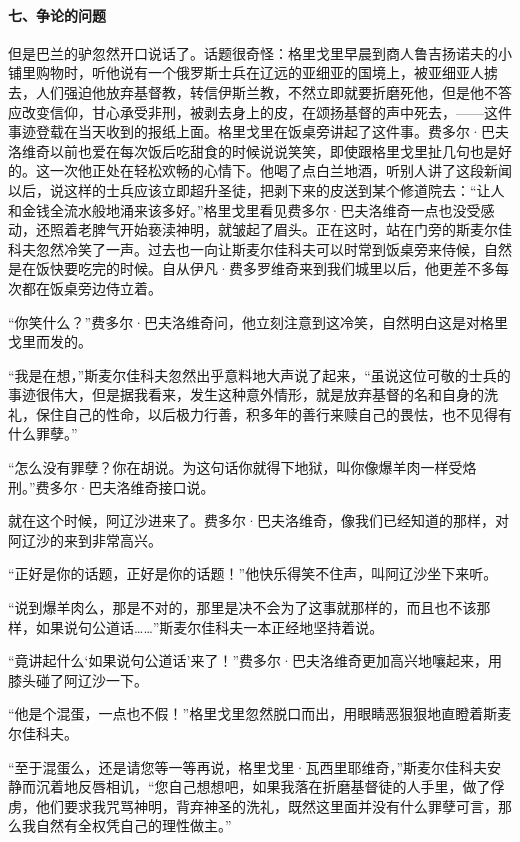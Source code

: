 \paragraph*{七、争论的问题}
\par 但是巴兰的驴忽然开口说话了。话题很奇怪：格里戈里早晨到商人鲁吉扬诺夫的小铺里购物时，听他说有一个俄罗斯士兵在辽远的亚细亚的国境上，被亚细亚人掳去，人们强迫他放弃基督教，转信伊斯兰教，不然立即就要折磨死他，但是他不答应改变信仰，甘心承受非刑，被剥去身上的皮，在颂扬基督的声中死去，——这件事迹登载在当天收到的报纸上面。格里戈里在饭桌旁讲起了这件事。费多尔·巴夫洛维奇以前也爱在每次饭后吃甜食的时候说说笑笑，即使跟格里戈里扯几句也是好的。这一次他正处在轻松欢畅的心情下。他喝了点白兰地酒，听别人讲了这段新闻以后，说这样的士兵应该立即超升圣徒，把剥下来的皮送到某个修道院去：“让人和金钱全流水般地涌来该多好。”格里戈里看见费多尔·巴夫洛维奇一点也没受感动，还照着老脾气开始亵渎神明，就皱起了眉头。正在这时，站在门旁的斯麦尔佳科夫忽然冷笑了一声。过去也一向让斯麦尔佳科夫可以时常到饭桌旁来侍候，自然是在饭快要吃完的时候。自从伊凡·费多罗维奇来到我们城里以后，他更差不多每次都在饭桌旁边侍立着。
\par “你笑什么？”费多尔·巴夫洛维奇问，他立刻注意到这冷笑，自然明白这是对格里戈里而发的。
\par “我是在想，”斯麦尔佳科夫忽然出乎意料地大声说了起来，“虽说这位可敬的士兵的事迹很伟大，但是据我看来，发生这种意外情形，就是放弃基督的名和自身的洗礼，保住自己的性命，以后极力行善，积多年的善行来赎自己的畏怯，也不见得有什么罪孽。”
\par “怎么没有罪孽？你在胡说。为这句话你就得下地狱，叫你像爆羊肉一样受烙刑。”费多尔·巴夫洛维奇接口说。
\par 就在这个时候，阿辽沙进来了。费多尔·巴夫洛维奇，像我们已经知道的那样，对阿辽沙的来到非常高兴。
\par “正好是你的话题，正好是你的话题！”他快乐得笑不住声，叫阿辽沙坐下来听。
\par “说到爆羊肉么，那是不对的，那里是决不会为了这事就那样的，而且也不该那样，如果说句公道话……”斯麦尔佳科夫一本正经地坚持着说。
\par “竟讲起什么‘如果说句公道话’来了！”费多尔·巴夫洛维奇更加高兴地嚷起来，用膝头碰了阿辽沙一下。
\par “他是个混蛋，一点也不假！”格里戈里忽然脱口而出，用眼睛恶狠狠地直瞪着斯麦尔佳科夫。
\par “至于混蛋么，还是请您等一等再说，格里戈里·瓦西里耶维奇，”斯麦尔佳科夫安静而沉着地反唇相讥，“您自己想想吧，如果我落在折磨基督徒的人手里，做了俘虏，他们要求我咒骂神明，背弃神圣的洗礼，既然这里面并没有什么罪孽可言，那么我自然有全权凭自己的理性做主。”
